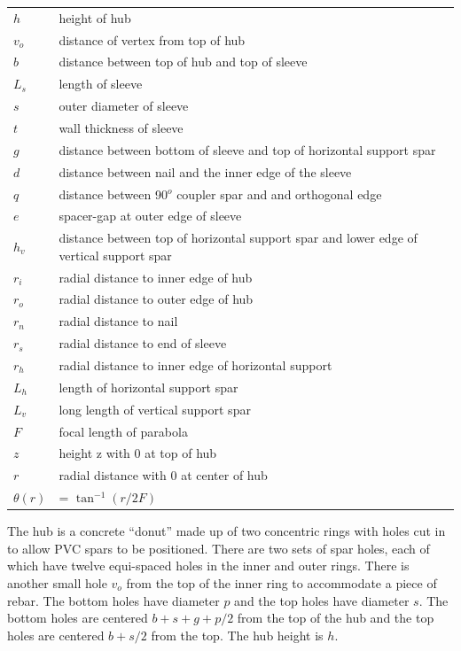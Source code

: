 \documentclass{article}
\begin{document}
\begin{tabular}{l l}
$h$          & height of hub \\
$v_o$      & distance of vertex from top of hub \\
$b$          & distance between top of hub and top of sleeve \\
$L_s$      & length of sleeve \\
$s$          & outer diameter of sleeve \\
$t$           & wall thickness of sleeve \\
$g$          & distance between bottom of sleeve and top of horizontal support spar \\
$d$          & distance between nail and the inner edge of the sleeve \\
$q$          & distance between 90$^o$ coupler spar and and orthogonal edge \\
$e$          & spacer-gap at outer edge of sleeve \\
$h_v$      & distance between top of horizontal support spar and lower edge of vertical support spar \\
$r_i$        & radial distance to inner edge of hub  \\
$r_o$       & radial distance to outer edge of hub  \\
$r_n$       & radial distance to nail  \\
$r_s$       & radial distance to end of sleeve  \\
$r_h$       & radial distance to inner edge of horizontal support \\
$L_h$      & length of horizontal support spar \\
$L_v$      & long length of vertical support spar \\
$F$          & focal length of parabola \\
$z$          & height z with 0 at top of hub \\
$r$           & radial distance with 0 at center of hub\\
$\theta(r)$& = $\tan^{-1}(r/2F)$
\end{tabular}

The hub is a concrete ``donut'' made up of two concentric rings with holes cut in to allow PVC spars to be positioned.  There are two sets of spar holes, each of which have twelve equi-spaced holes in the inner and outer rings.  There is another small hole $v_o$ from the top of the inner ring to accommodate a piece of rebar.  The bottom holes have diameter $p$ and the top holes have diameter $s$.  The bottom holes are centered $b+s+g+p/2$ from the top of the hub and the top holes are centered $b+s/2$ from the top.  The hub height is $h$.
\end{document}
